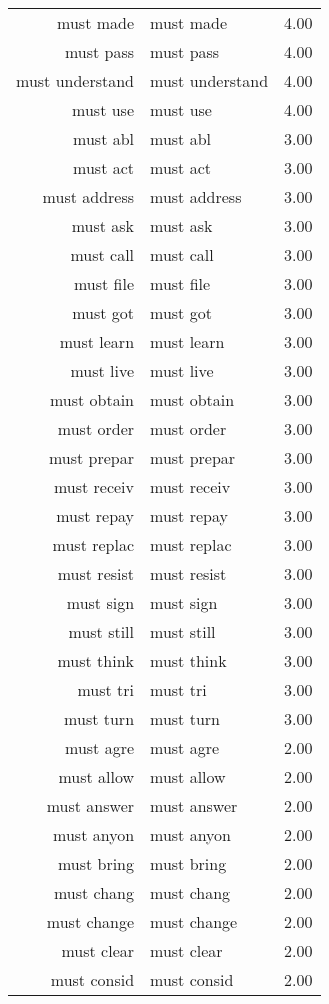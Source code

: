 \begin{table}[ht]
\begin{tabular}{rlr}
  must made & must made & 4.00 \\ 
  must pass & must pass & 4.00 \\ 
  must understand & must understand & 4.00 \\ 
  must use & must use & 4.00 \\ 
  must abl & must abl & 3.00 \\ 
  must act & must act & 3.00 \\ 
  must address & must address & 3.00 \\ 
  must ask & must ask & 3.00 \\ 
  must call & must call & 3.00 \\ 
  must file & must file & 3.00 \\ 
  must got & must got & 3.00 \\ 
  must learn & must learn & 3.00 \\ 
  must live & must live & 3.00 \\ 
  must obtain & must obtain & 3.00 \\ 
  must order & must order & 3.00 \\ 
  must prepar & must prepar & 3.00 \\ 
  must receiv & must receiv & 3.00 \\ 
  must repay & must repay & 3.00 \\ 
  must replac & must replac & 3.00 \\ 
  must resist & must resist & 3.00 \\ 
  must sign & must sign & 3.00 \\ 
  must still & must still & 3.00 \\ 
  must think & must think & 3.00 \\ 
  must tri & must tri & 3.00 \\ 
  must turn & must turn & 3.00 \\ 
  must agre & must agre & 2.00 \\ 
  must allow & must allow & 2.00 \\ 
  must answer & must answer & 2.00 \\ 
  must anyon & must anyon & 2.00 \\ 
  must bring & must bring & 2.00 \\ 
  must chang & must chang & 2.00 \\ 
  must change & must change & 2.00 \\ 
  must clear & must clear & 2.00 \\ 
  must consid & must consid & 2.00 \\ 

\end{tabular}
\end{table}
